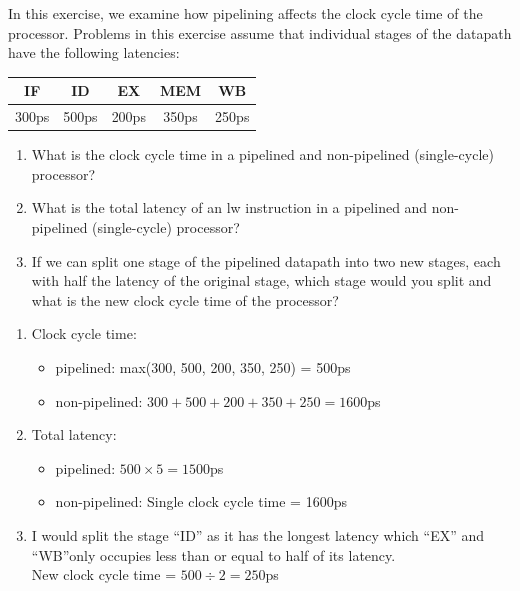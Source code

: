 \documentclass[12pt, a4paper]{article}
\begin{document}
\begin{q}{20}
In this exercise, we examine how pipelining affects the clock cycle time of the 
processor. Problems in this exercise assume that individual stages of the datapath 
have the following latencies:
\begin{center}
    \begin{tabular}{|c|c|c|c|c|}
        \hline
        \bf{IF} & \bf{ID} & \bf{EX} & \bf{MEM} & \bf{WB}\\
        \hline
        300ps & 500ps & 200ps & 350ps & 250ps\\
        \hline
    \end{tabular}
\end{center}
\begin{enumerate}
    \item What is the clock cycle time in a pipelined and non-pipelined (single-cycle) processor?
    \item What is the total latency of an lw instruction in a pipelined and non-pipelined
    (single-cycle) processor?
    \item If we can split one stage of the pipelined datapath into two new stages, each with
    half the latency of the original stage, which stage would you split and what is the
    new clock cycle time of the processor?
\end{enumerate}
\end{q}
\begin{ans}
    \begin{enumerate}
        \item Clock cycle time: 
            \begin{itemize}
                \item pipelined: max(300, 500, 200, 350, 250) = 500ps
                \item non-pipelined: $300+500+200+350+250=1600$ps
            \end{itemize}
        \item Total latency: 
            \begin{itemize}
                \item pipelined: $500 \times 5 = 1500$ps
                \item non-pipelined: Single clock cycle time = 1600ps
            \end{itemize}
        \item I would split the stage ``ID'' as it has the longest latency which ``EX'' and ``WB''only occupies less than or equal to half of its latency. \\
        New clock cycle time = $500\div 2 = 250$ps
    \end{enumerate}
\end{ans}
\end{document}
